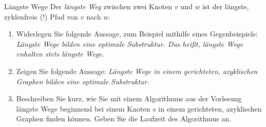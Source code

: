 \documentclass[11pt,a4paper]{article}
\begin{document}
\begin{aufgabe}{4}{Längste Wege}
    Der \emph{längste Weg} zwischen zwei Knoten $v$ und $w$ ist der längste, zyklenfreie (!) Pfad von $v$ nach $w$.
    \begin{enumerate}[label=\alph*)]
        \item Widerlegen Sie folgende Aussage, zum Beispiel mithilfe eines Gegenbeispiels:
        \emph{Längste Wege bilden eine optimale Substruktur. Das heißt, längste Wege enhalten stets längste Wege.}
        \item\label{longest_path_dag}Zeigen Sie folgende Aussage:
        \emph{Längste Wege in einem gerichteten, azyklischen Graphen bilden eine optimale Substruktur.}
        \item Beschreiben Sie kurz, wie Sie mit einem Algorithmus aus der Vorlesung längste Wege beginnend bei einem Knoten $s$ in einem gerichteten, azyklischen Graphen finden können.
        Geben Sie die Laufzeit des Algorithmus an.
    \end{enumerate}
\end{aufgabe}
\end{document}
